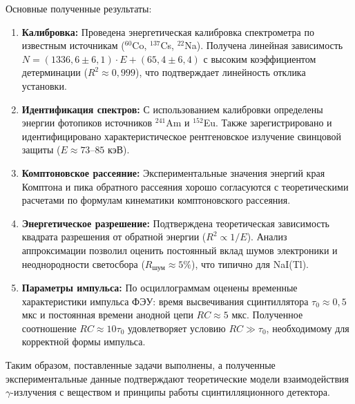 \documentclass[12pt,a4paper]{article}
\begin{document}
Основные полученные результаты:
\begin{enumerate}
    \item \textbf{Калибровка:} Проведена энергетическая калибровка спектрометра по известным источникам ($^{60}$Co, $^{137}$Cs, $^{22}$Na). Получена линейная зависимость $N = (1336,6 \pm 6,1) \cdot E + (65,4 \pm 6,4)$ с высоким коэффициентом детерминации ($R^2 \approx 0,999$), что подтверждает линейность отклика установки.
    \item \textbf{Идентификация спектров:} С использованием калибровки определены энергии фотопиков источников $^{241}$Am и $^{152}$Eu. Также зарегистрировано и идентифицировано характеристическое рентгеновское излучение свинцовой защиты ($E \approx 73\text{--}85$ кэВ).
    \item \textbf{Комптоновское рассеяние:} Экспериментальные значения энергий края Комптона и пика обратного рассеяния хорошо согласуются с теоретическими расчетами по формулам кинематики комптоновского рассеяния.
    \item \textbf{Энергетическое разрешение:} Подтверждена теоретическая зависимость квадрата разрешения от обратной энергии ($R^2 \propto 1/E$). Анализ аппроксимации позволил оценить постоянный вклад шумов электроники и неоднородности светосбора ($R_{\text{шум}} \approx 5\%$), что типично для NaI(Tl).
    \item \textbf{Параметры импульса:} По осциллограммам оценены временные характеристики импульса ФЭУ: время высвечивания сцинтиллятора $\tau_0 \approx 0,5$ мкс и постоянная времени анодной цепи $RC \approx 5$ мкс. Полученное соотношение $RC \approx 10\tau_0$ удовлетворяет условию $RC \gg \tau_0$, необходимому для корректной формы импульса.
\end{enumerate}

Таким образом, поставленные задачи выполнены, а полученные экспериментальные данные подтверждают теоретические модели взаимодействия $\gamma$-излучения с веществом и принципы работы сцинтилляционного детектора.
\end{document}
